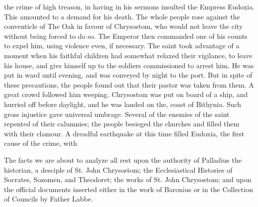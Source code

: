 the crime of high treason, in having in his sermons insulted the Empress Eudoxia. This amounted to a demand for his death. The whole people rose against the conventicle of The Oak in favour of Chrysostom, who would not leave the city without being forced to do so. The Emperor then commanded one of his counts to expel him, using violence even, if necessary. The saint took advantage of a moment when his faithful children had somewhat relaxed their vigilance, to leave his house, and give himself up to the soldiers commissioned to arrest him. He was put in ward until evening, and was conveyed by night to the port. But in spite of these precautions, the people found out that their pastor was taken from them. A great crowd followed him weeping. Chrysostom was put on board of a ship, and hurried off before daylight, and he was landed on the, coast of Bithynia. Such gross injustice gave universal umbrage. Several of the enemies of the saint repented of their calumnies; the people besieged the churches and filled them with their clamour. A dreadful earthquake at this time filled Eudoxia, the first cause of the crime, with

The facts we are about to analyze all rest upon the authority of Palladius the historian, a desciple of St. John Chrysostom; the Ecclesiastical Histories of Socrates, Sozomen, and Theodoret; the works of St. John Chrysostom; and upon the official documents inserted either in the work of Baronius or in the Collection of Councils by Father Labbe.

